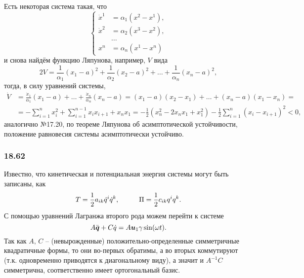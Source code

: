 Есть некоторая система такая, что
\begin{equation*}
    \left\{\begin{aligned}
        \dot{x}^1 &= \alpha_1 (x^2 - x^1), \\
        \dot{x}^2 &= \alpha_2 (x^3 - x^2), \\
        &\ldots\\
        x^n &= \alpha_n (x^1 - x^n)
    \end{aligned}\right.
\end{equation*}
и снова найдём функцию Ляпунова, например, $V$ вида
\begin{equation*}
    2 V = \frac{1}{\alpha_1}(x_1 - a)^2 + \frac{1}{\alpha_2} (x_2 - a)^2 + \ldots + \frac{1}{\alpha_n}(x_n - a)^2,
\end{equation*}
тогда, в силу уравнений системы,
\begin{align*}
    \dot{V} &= \frac{\dot{x}_1}{\alpha_1} (x_1 - a) + \ldots + 
    \frac{\dot{x}_n}{\alpha_n}(x_n - a) = 
    (x_1 - a) (x_2 - x_1) + \ldots + (x_n - a) (x_1 - x_n) = \\
    &= - \sum_{i=1}^{n} x_i^2 + 
    \sum_{i=1}^{n-1} x_i x_{i+1} + x_n x_1 = 
    - \frac{1}{2}(x_n^2 - 2 x_n x_1 + x_1^2) - \frac{1}{2} 
    \sum_{i=1}^{n} (x_i - x_{i+1})^2 < 0,
\end{align*}
аналогично №17.20,
по теореме Ляпунова об асимптотической устойчивости,
положение равновесия системы асимптотически устойчиво.













\subsubsection*{18.62}
Известно, что кинетическая и потенциальная энергия системы могут быть записаны, как
\begin{equation*}
    T = \frac{1}{2} a_{ik} \dot{q}^i \dot{q}^k,
    \hspace{1 cm}
    \Pi = \frac{1}{2} c_{ik} q^i q^k.
\end{equation*}
С помощью уравнений Лагранжа второго рода можем перейти  к системе
\begin{equation*}
    A \ddot{\mbox{\boldmath $q$}} + C \dot{q} = A \mbox{\boldmath $u$}_1 \gamma \sin (\omega t).
\end{equation*}
Так как $A, \,C$ -- (невырожденные) положительно-определенные симметричные квадратичные формы, то они во-первых обратимы, а во вторых коммутируют (т.к. одновременно приводятся к диагональному виду), а значит и $A^{-1} C$ симметрична, соответственно имеет ортогональный базис.

